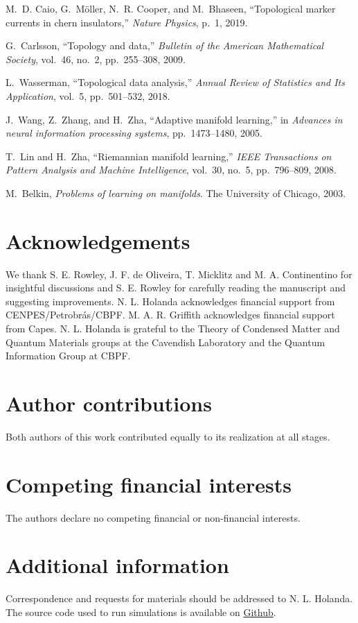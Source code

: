 \documentclass[10pt]{revtex4-1}
\begin{document}
\begin{thebibliography}{10}
M.~D. Caio, G.~M{\"o}ller, N.~R. Cooper, and M.~Bhaseen, ``Topological marker
  currents in chern insulators,'' {\em Nature Physics}, p.~1, 2019.

G.~Carlsson, ``Topology and data,'' {\em Bulletin of the American Mathematical
  Society}, vol.~46, no.~2, pp.~255--308, 2009.

L.~Wasserman, ``Topological data analysis,'' {\em Annual Review of Statistics
  and Its Application}, vol.~5, pp.~501--532, 2018.

J.~Wang, Z.~Zhang, and H.~Zha, ``Adaptive manifold learning,'' in {\em Advances
  in neural information processing systems}, pp.~1473--1480, 2005.

T.~Lin and H.~Zha, ``Riemannian manifold learning,'' {\em IEEE Transactions on
  Pattern Analysis and Machine Intelligence}, vol.~30, no.~5, pp.~796--809,
  2008.

M.~Belkin, {\em Problems of learning on manifolds}.
\newblock The University of Chicago, 2003.

\end{thebibliography}

\section*{Acknowledgements}

We thank S. E. Rowley, J. F. de Oliveira, T. Micklitz and M. A. Continentino for insightful discussions and S. E. Rowley for carefully reading the manuscript and suggesting improvements. N. L. Holanda acknowledges financial support from CENPES/Petrobr\'as/CBPF. M. A. R. Griffith acknowledges financial support from Capes. N. L. Holanda is grateful to the Theory of Condensed Matter and Quantum Materials groups at the Cavendish Laboratory and the Quantum Information Group at CBPF.


\section*{Author contributions}

Both authors of this work contributed equally to its realization at all stages.

\section*{Competing financial interests}

The authors declare no competing financial or non-financial interests.

\section*{Additional information}

Correspondence and requests for materials should be addressed to N. L. Holanda. The source code used to run simulations is available on \href{https://github.com/linneuholanda/ml_topological_phases_in_real_space}{Github}.


\end{document}
